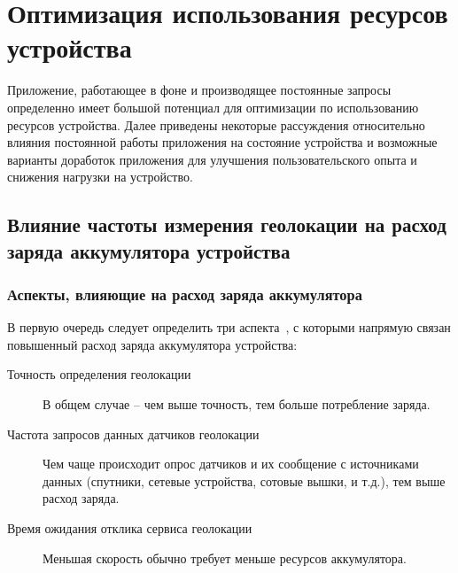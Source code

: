 \chapter{Оптимизация использования ресурсов устройства}
Приложение, работающее в фоне и производящее постоянные запросы определенно имеет большой потенциал для оптимизации по использованию ресурсов устройства. Далее приведены некоторые рассуждения относительно влияния постоянной работы приложения на состояние устройства и возможные варианты доработок приложения для улучшения пользовательского опыта и снижения нагрузки на устройство.

\section{Влияние частоты измерения геолокации на расход заряда аккумулятора устройства}
\subsection*{Аспекты, влияющие на расход заряда аккумулятора}
В первую очередь следует определить три аспекта~\autocite{battery}, с которыми напрямую связан повышенный расход заряда аккумулятора устройства:
\begin{description}
	\item[Точность определения геолокации] В общем случае – чем выше точность, тем больше потребление заряда.
	\item[Частота запросов данных датчиков геолокации] Чем чаще происходит опрос датчиков и их сообщение с источниками данных (спутники, сетевые устройства, сотовые вышки, и т.д.), тем выше расход заряда.
	\item[Время ожидания отклика сервиса геолокации] Меньшая скорость обычно требует меньше ресурсов аккумулятора.
\end{description}

